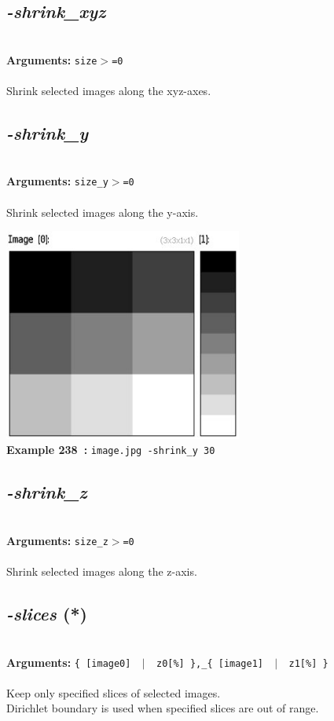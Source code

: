\documentclass[a4paper,11pt,twoside]{book}
\begin{document}
\subsection{\emph{-shrink\_xyz} }\vspace*{-0.5em}
~\\\textbf{Arguments: } 
{\small \texttt{size$>$=0}}\\~\\
Shrink selected images along the xyz-axes.


\subsection{\emph{-shrink\_y} }\vspace*{-0.5em}
~\\\textbf{Arguments: } 
{\small \texttt{size\_y$>$=0}}\\~\\
Shrink selected images along the y-axis.
\begin{center}\includegraphics[keepaspectratio=true,height=7cm,width=\textwidth]{img/gmic_def238.jpg}\\
{\footnotesize \textbf{Example 238~:} \texttt{image.jpg -shrink\_y 30}}
\end{center}

\subsection{\emph{-shrink\_z} }\vspace*{-0.5em}
~\\\textbf{Arguments: } 
{\small \texttt{size\_z$>$=0}}\\~\\
Shrink selected images along the z-axis.


\subsection{\emph{-slices} (*)}\vspace*{-0.5em}
~\\\textbf{Arguments: } 
{\small \texttt{\{ [image0] ~$|$~ z0[\%] \},\_\{ [image1] ~$|$~ z1[\%] \}}}\\~\\
Keep only specified slices of selected images.
~\\Dirichlet boundary is used when specified slices are out of range.
\end{document}

